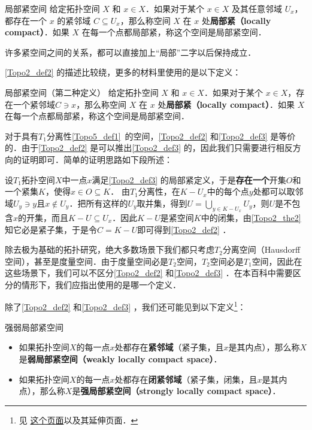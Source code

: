 \begin{definition}{局部紧空间}\label{Topo2_def2}
给定拓扑空间 $X$ 和 $x\in X$．如果对于某个 $x\in X$ 及其任意邻域 $U_x$，都存在一个 $x$ 的紧邻域 $C\subseteq U_x$，那么称空间 $X$ 在 $x$ 处\textbf{局部紧（locally compact）}．如果 $X$ 在每一个点都局部紧，称这个空间是局部紧空间．
\end{definition}

许多紧空间之间的关系，都可以直接加上“局部”二字以后保持成立．

\autoref{Topo2_def2} 的描述比较绕，更多的材料里使用的是以下定义：

\begin{definition}{局部紧空间（第二种定义）}\label{Topo2_def3}
给定拓扑空间 $X$ 和 $x\in X$．如果对于某个 $x\in X$，存在一个紧邻域$C\ni x$，那么称空间 $X$ 在 $x$ 处\textbf{局部紧（locally compact）}．如果 $X$ 在每一个点都局部紧，称这个空间是局部紧空间．
\end{definition}

对于具有$T_1$分离性\autoref{Topo5_def1}~的空间，\autoref{Topo2_def2} 和\autoref{Topo2_def3} 是等价的．由于\autoref{Topo2_def2} 是可以推出\autoref{Topo2_def3} 的，因此我们只需要进行相反方向的证明即可．简单的证明思路如下段所述：

设$T_1$拓扑空间$X$中一点$x$满足\autoref{Topo2_def3} 的局部紧定义，于是\textbf{存在一个}开集$O$和一个紧集$K$，使得$x\in O\subseteq K$．
由$T_1$分离性，在$K-U_x$中的每个点$y$处都可以取邻域$U_y\ni y$且$x\not\in U_y$．把所有这样的$U_y$取并集，得到$U=\bigcup\limits_{y\in K-U_x}U_y$，则$U$是不包含$x$的开集，而且$K-U\subseteq U_x$．因此$K-U$是紧空间$K$中的闭集，由\autoref{Topo2_the2} 知它必是紧子集，于是令$C=K-U$即可得到\autoref{Topo2_def2} ．

除去极为基础的拓扑研究，绝大多数场景下我们都只考虑$T_2$分离空间（Hausdorff空间），甚至是度量空间．由于度量空间必是$T_2$空间，$T_2$空间必是$T_1$空间，因此在这些场景下，我们可以不区分\autoref{Topo2_def2} 和\autoref{Topo2_def3} ．在本百科中需要区分的情形下，我们应指出使用的是哪一个定义．

除了\autoref{Topo2_def2} 和\autoref{Topo2_def3} ，我们还可能见到以下定义\footnote{见 \href{https://proofwiki.org/wiki/Strongly_Locally_Compact_Space_is_Weakly_Locally_Compact}{这个页面}以及其延伸页面．}：

\begin{definition}{强弱局部紧空间}\label{Topo2_def4}
\begin{itemize}
\item 如果拓扑空间$X$的每一点$x$处都存在\textbf{紧邻域}（紧子集，且$x$是其内点），那么称$X$是\textbf{弱局部紧空间（weakly locally compact space）}．
\item 如果拓扑空间$X$的每一点$x$处都存在\textbf{闭紧邻域}（紧子集，闭集，且$x$是其内点），那么称$X$是\textbf{强局部紧空间（strongly locally compact space）}．
\end{itemize}
\end{definition}

